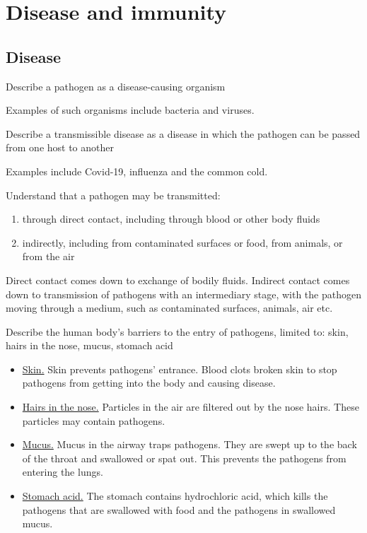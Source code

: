 \section{Disease and immunity}
\subsection{Disease}

\begin{point}
Describe a pathogen as a disease-causing organism
\end{point}

Examples of such organisms include bacteria and viruses.

\begin{point}
Describe a transmissible disease as a disease in which the pathogen can be passed from one host to 
another
\end{point}

Examples include Covid-19, influenza and the common cold.

\begin{point}
Understand that a pathogen may be transmitted: 
\begin{enumerate}[label=(\alph*)]
\setlength\itemsep{0em}
\item through direct contact, including through blood or other body fluids
\item indirectly, including from contaminated surfaces or food, from animals, or from the air
\end{enumerate}
\end{point}

Direct contact comes down to exchange of bodily fluids. Indirect contact comes down to 
transmission of pathogens with an intermediary stage, with the pathogen moving through a medium, 
such as contaminated surfaces, animals, air etc.

\begin{point}
Describe the human body’s barriers to the entry of pathogens, limited to: skin, hairs in the nose, mucus, 
stomach acid
\end{point}

\begin{itemize}
\item\underline{Skin.}
Skin prevents pathogens' entrance. Blood clots broken skin to stop pathogens from getting into the
body and causing disease.

\item\underline{Hairs in the nose.} Particles in the air are filtered out by the nose hairs. These 
particles may contain pathogens.

\item\underline{Mucus.} Mucus in the airway traps pathogens. They are swept up to the back of the throat
and swallowed or spat out. This prevents the pathogens from entering the lungs. 

\item\underline{Stomach acid.} The stomach contains hydrochloric acid, which kills the pathogens that
are swallowed with food and the pathogens in swallowed mucus.
\end{itemize}


